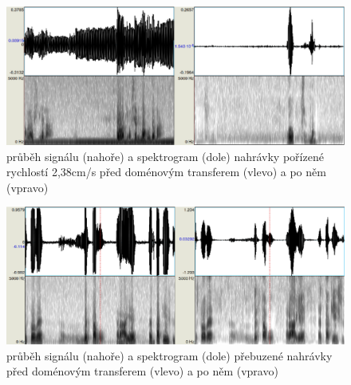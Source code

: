 \begin{figure}[htpb]
\includegraphics[scale=0.4]{rc/gan-plzen.eps}
\caption{průběh signálu (nahoře) a spektrogram (dole) nahrávky pořízené
rychlostí 2,38cm/s před doménovým transferem (vlevo) a po něm (vpravo)}
\label{fig:gan:plzen}
\end{figure}

\begin{figure}[htpb]
\includegraphics[scale=0.4]{rc/gan-overdrive.eps}
\caption{průběh signálu (nahoře) a spektrogram (dole) přebuzené nahrávky
před doménovým transferem (vlevo) a po něm (vpravo)}
\label{fig:gan:overdrive}
\end{figure}
